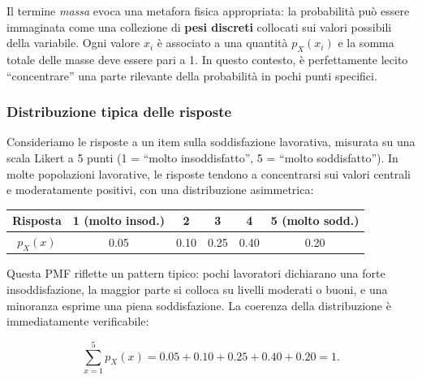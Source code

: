 \documentclass[
  italian,
  letterpaper,
  a4paper,
  11pt,
  open=any]{scrbook}
\newcounter{none} %
\theoremstyle{plain}
\theoremstyle{definition}
\theoremstyle{definition}
\theoremstyle{remark}
\begin{document}
Il termine \emph{massa} evoca una metafora fisica appropriata: la
probabilità può essere immaginata come una collezione di \textbf{pesi
discreti} collocati sui valori possibili della variabile. Ogni valore
\(x_i\) è associato a una quantità \(p_X(x_i)\) e la somma totale delle
masse deve essere pari a 1. In questo contesto, è perfettamente lecito
``concentrare'' una parte rilevante della probabilità in pochi punti
specifici.

\begin{tcolorbox}[enhanced jigsaw, arc=.35mm, bottomrule=.15mm, bottomtitle=1mm, breakable, colback=white, colbacktitle=quarto-callout-note-color!10!white, colframe=quarto-callout-note-color-frame, coltitle=black, left=2mm, leftrule=.75mm, opacityback=0, opacitybacktitle=0.6, rightrule=.15mm, title=\textcolor{quarto-callout-note-color}{\faInfo}\hspace{0.5em}{Esempio: soddisfazione lavorativa su scala Likert}, titlerule=0mm, toprule=.15mm, toptitle=1mm]

\subsubsection*{Distribuzione tipica delle
risposte}\label{distribuzione-tipica-delle-risposte}

Consideriamo le risposte a un item sulla soddisfazione lavorativa,
misurata su una scala Likert a 5 punti (1 = ``molto insoddisfatto'', 5 =
``molto soddisfatto''). In molte popolazioni lavorative, le risposte
tendono a concentrarsi sui valori centrali e moderatamente positivi, con
una distribuzione asimmetrica:

{\def\LTcaptype{none} %
\begin{longtable}[]{@{}cccccc@{}}
\toprule\noalign{}
Risposta & 1 (molto insod.) & 2 & 3 & 4 & 5 (molto sodd.) \\
\midrule\noalign{}
\endhead
\bottomrule\noalign{}
\endlastfoot
\(p_X(x)\) & 0.05 & 0.10 & 0.25 & 0.40 & 0.20 \\
\end{longtable}
}

Questa PMF riflette un pattern tipico: pochi lavoratori dichiarano una
forte insoddisfazione, la maggior parte si colloca su livelli moderati o
buoni, e una minoranza esprime una piena soddisfazione. La coerenza
della distribuzione è immediatamente verificabile:

\[
\sum_{x=1}^{5} p_X(x) = 0.05 + 0.10 + 0.25 + 0.40 + 0.20 = 1.
\]


\end{tcolorbox}
\end{document}
